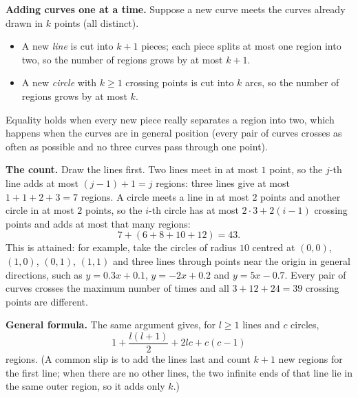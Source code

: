 \textbf{Adding curves one at a time.} Suppose a new curve meets the curves already drawn in $k$ points (all distinct).
\begin{itemize}
\item A new \emph{line} is cut into $k+1$ pieces; each piece splits at most one region into two, so the number of regions grows by at most $k+1$.
\item A new \emph{circle} with $k\ge1$ crossing points is cut into $k$ arcs, so the number of regions grows by at most $k$.
\end{itemize}
Equality holds when every new piece really separates a region into two, which happens when the curves are in general position (every pair of curves crosses as often as possible and no three curves pass through one point).

\textbf{The count.} Draw the lines first. Two lines meet in at most $1$ point, so the $j$-th line adds at most $(j-1)+1=j$ regions: three lines give at most $1+1+2+3=7$ regions. A circle meets a line in at most $2$ points and another circle in at most $2$ points, so the $i$-th circle has at most $2\cdot3+2(i-1)$ crossing points and adds at most that many regions:
\[
7+(6+8+10+12)=\boxed{43}.
\]
This is attained: for example, take the circles of radius $10$ centred at $(0,0)$, $(1,0)$, $(0,1)$, $(1,1)$ and three lines through points near the origin in general directions, such as $y=0.3x+0.1$, $y=-2x+0.2$ and $y=5x-0.7$. Every pair of curves crosses the maximum number of times and all $3+12+24=39$ crossing points are different.

\textbf{General formula.} The same argument gives, for $l\ge1$ lines and $c$ circles,
\[
1+\dfrac{l(l+1)}{2}+2lc+c(c-1)
\]
regions. (A common slip is to add the lines last and count $k+1$ new regions for the first line; when there are no other lines, the two infinite ends of that line lie in the same outer region, so it adds only $k$.)
